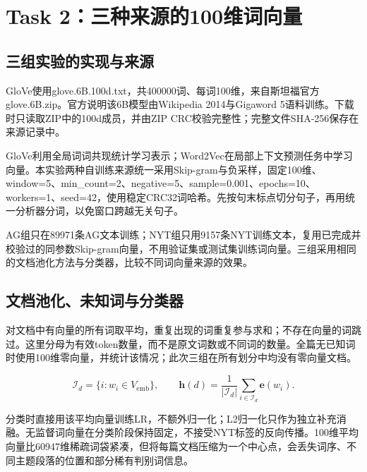 \documentclass[UTF8,a4paper,11pt,fontset=fandol]{ctexart}
\begin{document}
\section{Task 2：三种来源的100维词向量}
\subsection{三组实验的实现与来源}
GloVe使用glove.6B.100d.\allowbreak{}txt，共400000词、每词100维，来自斯坦福官方glove.6B.\allowbreak{}zip。官方说明该6B模型由Wikipedia 2014与Gigaword 5语料训练。下载时只读取ZIP中的100d成员，并由ZIP CRC校验完整性；完整文件SHA-256保存在来源记录中。

GloVe利用全局词词共现统计学习表示；Word2Vec在局部上下文预测任务中学习向量。本实验两种自训练来源统一采用Skip-gram与负采样，固定100维、window=5、min\_\allowbreak{}count=2、negative=5、sample=0.001、epochs=10、workers=1、seed=42，使用稳定CRC32词哈希。先按句末标点切分句子，再用统一分析器分词，以免窗口跨越无关句子。

AG组只在89971条AG文本训练；NYT组只用9157条NYT训练文本，复用已完成并校验过的同参数Skip-gram向量，不用验证集或测试集训练词向量。三组采用相同的文档池化方法与分类器，比较不同词向量来源的效果。

\subsection{文档池化、未知词与分类器}
对文档中有向量的所有词取平均，重复出现的词重复参与求和；不存在向量的词跳过。这里分母为有效token数量，而不是原文词数或不同词的数量。全篇无已知词时使用100维零向量，并统计该情况；此次三组在所有划分中均没有零向量文档。

\[
\mathcal I_d=\{i:w_i\in V_{\mathrm{emb}}\},\qquad
\boldsymbol h(d)=\frac{1}{|\mathcal I_d|}\sum_{i\in\mathcal I_d}\boldsymbol e(w_i).
\]

分类时直接用该平均向量训练LR，不额外归一化；L2归一化只作为独立补充消融。无监督词向量在分类阶段保持固定，不接受NYT标签的反向传播。100维平均向量比60947维稀疏词袋紧凑，但将每篇文档压缩为一个中心点，会丢失词序、不同主题段落的位置和部分稀有判别词信息。
\end{document}
